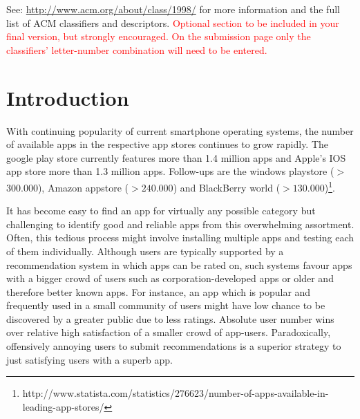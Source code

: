 \documentclass{sigchi}
\begin{document}
See: \url{http://www.acm.org/about/class/1998/}
for more information and the full list of ACM classifiers
and descriptors. \newline
\textcolor{red}{Optional section to be included in your final version, 
but strongly encouraged. On the submission page only the classifiers’ 
letter-number combination will need to be entered.}

\section{Introduction}

% 


With continuing popularity of current smartphone operating systems, the number of available apps in the respective app stores continues to grow rapidly.
The google play store currently features more than 1.4 million apps and Apple's IOS app store more than 1.3 million apps. 
Follow-ups are the windows playstore ($>$300.000), Amazon appstore ($>240.000$) and BlackBerry world ($>130.000$)\footnote{http://www.statista.com/statistics/276623/number-of-apps-available-in-leading-app-stores/}.

It has become easy to find an app for virtually any possible category but challenging to identify good and reliable apps from this overwhelming assortment. 
Often, this tedious process might involve installing multiple apps and testing each of them individually. 
Although users are typically supported by a recommendation system in which apps can be rated on, such systems favour apps with a bigger crowd of users such as corporation-developed apps or older and therefore better known apps.
For instance, an app which is popular and frequently used in a small community of users might have low chance to be discovered by a greater public due to less ratings. 
Absolute user number wins over relative high satisfaction of a smaller crowd of app-users.
Paradoxically, offensively annoying users to submit recommendations is a superior strategy to just satisfying users with a superb app.  
\end{document}
